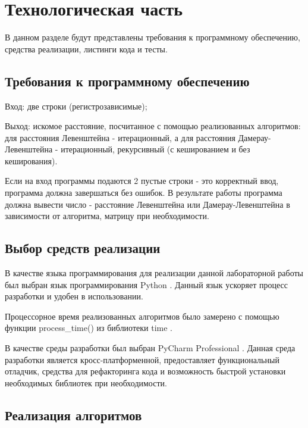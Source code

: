 \chapter{Технологическая часть}

В данном разделе будут представлены требования к программному обеспечению, средства реализации, листинги кода и тесты.

\section{Требования к программному обеспечению}
Вход: две строки (регистрозависимые);

Выход: искомое расстояние, посчитанное с помощью реализованных алгоритмов: для расстояния Левенштейна - итерационный, а для расстояния Дамерау-Левенштейна - итерационный, рекурсивный (с кешированием и без кеширования).

Если на вход программы подаются 2 пустые строки - это корректный ввод, программа должна завершаться без ошибок.
В результате работы программа должна вывести число - расстояние Левенштейна или Дамерау-Левенштейна в зависимости от алгоритма, матрицу при необходимости.


\section{Выбор средств реализации}

В качестве языка программирования для реализации данной лабораторной работы был выбран язык программирования Python  \cite{PythonBook}. Данный язык ускоряет процесс разработки и удобен в использовании.

Процессорное время реализованных алгоритмов было замерено с помощью функции process\_time() из библиотеки time \cite{process_time_text}.

В качестве среды разработки был выбран PyCharm Professional \cite{pycharm}. Данная среда разработки является кросс-платформенной, предоставляет функциональный отладчик, средства для рефакторинга кода и возможность быстрой установки необходимых библиотек при необходимости.

\section{Реализация алгоритмов}

